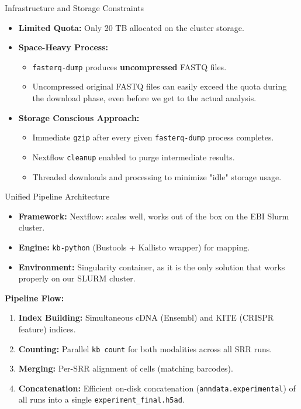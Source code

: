 \documentclass[handout]{beamer}
\begin{document}
\begin{frame}{Infrastructure and Storage Constraints}
    \begin{itemize}
        \item \textbf{Limited Quota:} Only 20 TB allocated on the cluster storage.
        \item \textbf{Space-Heavy Process:} 
            \begin{itemize}
                \item \texttt{fasterq-dump} produces \textbf{uncompressed} FASTQ files.
                \item Uncompressed original FASTQ files can easily exceed the quota during the download phase, even before we get to the actual analysis.
            \end{itemize}
        \item \textbf{Storage Conscious Approach:} 
            \begin{itemize}
                \item Immediate \texttt{gzip} after every given \texttt{fasterq-dump} process completes.
                \item Nextflow \texttt{cleanup} enabled to purge intermediate results.
                \item Threaded downloads and processing to minimize "idle" storage usage.
            \end{itemize}
    \end{itemize}
\end{frame}

\begin{frame}{Unified Pipeline Architecture}
    \begin{itemize}
        \item \textbf{Framework:} Nextflow: scales well, works out of the box on the EBI Slurm cluster.
        \item \textbf{Engine:} \texttt{kb-python} (Bustools + Kallisto wrapper) for mapping.
        \item \textbf{Environment:} Singularity container, as it is the only solution that works properly on our SLURM cluster.
    \end{itemize}
    \vspace{0.5em}
    \begin{center}
        \textbf{Pipeline Flow:}
        \begin{enumerate}
            \item \textbf{Index Building:} Simultaneous cDNA (Ensembl) and KITE (CRISPR feature) indices.
            \item \textbf{Counting:} Parallel \texttt{kb count} for both modalities across all SRR runs.
            \item \textbf{Merging:} Per-SRR alignment of cells (matching barcodes).
            \item \textbf{Concatenation:} Efficient on-disk concatenation (\texttt{anndata.experimental}) of all runs into a single \texttt{experiment\_final.h5ad}.
        \end{enumerate}
    \end{center}
\end{frame}
\end{document}
